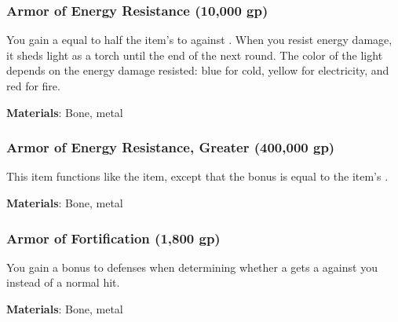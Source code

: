 \lowercase{\hypertarget{item:Armor of Energy Resistance}{}}\label{item:Armor of Energy Resistance}
\hypertarget{item:Armor of Energy Resistance}{\subsubsection{Armor of Energy Resistance\hfill{} (10,000 gp)}}

You gain a  equal to half the item's  to  against .
When you resist energy damage, it sheds light as a torch until the end of the next round.
The color of the light depends on the energy damage resisted: blue for cold, yellow for electricity, and red for fire.



\vspace{0.25em}
\textbf{Materials}: Bone, metal


\lowercase{\hypertarget{item:Armor of Energy Resistance, Greater}{}}\label{item:Armor of Energy Resistance, Greater}
\hypertarget{item:Armor of Energy Resistance, Greater}{\subsubsection{Armor of Energy Resistance, Greater\hfill{} (400,000 gp)}}

This item functions like the  item, except that the bonus is equal to the item's .



\vspace{0.25em}
\textbf{Materials}: Bone, metal


\lowercase{\hypertarget{item:Armor of Fortification}{}}\label{item:Armor of Fortification}
\hypertarget{item:Armor of Fortification}{\subsubsection{Armor of Fortification\hfill{} (1,800 gp)}}

You gain a  bonus to defenses when determining whether a  gets a  against you instead of a normal hit.



\vspace{0.25em}
\textbf{Materials}: Bone, metal


